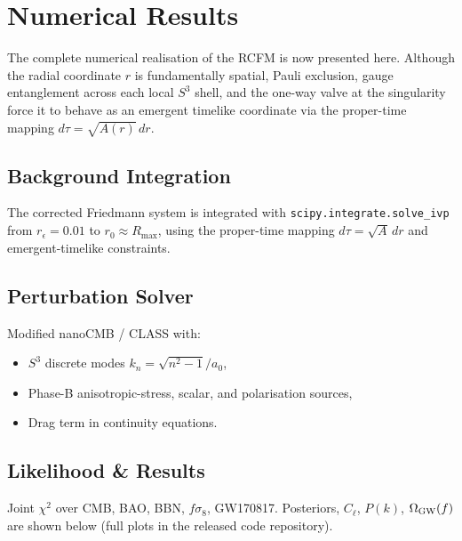 \documentclass[10pt,twocolumn]{article}
\theoremstyle{definition}
\newcommand{\Rmax}{R_{\max}}
\begin{document}
\section{Numerical Results}
\label{sec:numerical}

The complete numerical realisation of the RCFM is now presented here. Although the radial coordinate \( r \) is fundamentally spatial, Pauli exclusion, gauge entanglement across each local \( S^3 \) shell, and the one-way valve at the singularity force it to behave as an emergent timelike coordinate via the proper-time mapping \( d\tau = \sqrt{A(r)}\,dr \).

\subsection{Background Integration}
The corrected Friedmann system is integrated with
\texttt{scipy.integrate.solve\_ivp} from \( r_\epsilon = 0.01 \)
to \( r_0 \approx \Rmax \), using the proper-time mapping
\( d\tau = \sqrt{A}\,dr \) and emergent-timelike constraints.

\subsection{Perturbation Solver}
Modified nanoCMB / CLASS with:
\begin{itemize}
\item \( S^3 \) discrete modes \( k_n = \sqrt{n^2-1}/a_0 \),
\item Phase-B anisotropic-stress, scalar, and polarisation
  sources,
\item Drag term in continuity equations.
\end{itemize}

\subsection{Likelihood \& Results}
Joint \(\chi^2\) over CMB, BAO, BBN, \(f\sigma_8\), GW170817.
Posteriors, \(C_\ell\), \(P(k)\), \(\Omega_{\rm GW}(f)\)
are shown below (full plots in the released code repository).
\end{document}
